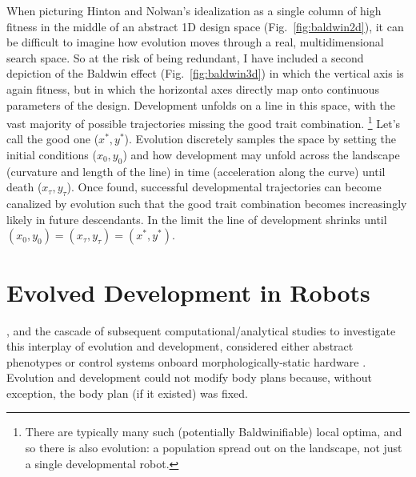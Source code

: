 When picturing Hinton and Nolwan's idealization as a single column of high fitness in the middle of an abstract 1D design space (Fig.~\ref{fig:baldwin2d}), it can be difficult to imagine how evolution moves through a real, multidimensional search space. 
So at the risk of being redundant, 
I have included a second depiction of the Baldwin effect (Fig.~\ref{fig:baldwin3d}) in which the vertical axis is again fitness, but in which the horizontal axes directly map onto continuous parameters of the design.
Development unfolds on a line in this space, with the vast majority of possible trajectories missing the good trait combination.%
\footnote{%
There are typically many such (potentially Baldwinifiable) local optima, and so there is also evolution: a population spread out on the landscape, not just a single developmental robot.%
} 
Let's call the good one ($x^*,y^*$).
Evolution discretely samples the space by setting the initial conditions ($x_0,y_0$) and how development may unfold across the landscape (curvature and length of the line) in time (acceleration along the curve) until death ($x_{\tau},y_{\tau}$).
Once found, successful developmental trajectories can become canalized by evolution such that the good trait combination becomes increasingly likely in future descendants.
In the limit the line of development shrinks until $(x_0,y_0) = (x_{\tau},y_{\tau}) = (x^*,y^*)$.




\section{Evolved Development in Robots}


\citet{hinton1987learning}, and the cascade of subsequent computational/analytical studies to investigate this interplay of evolution and development,
considered either abstract phenotypes \cite{belew1989evolution,ackley1991interactions,nolfi1994learning,french1994genes,mayley1996landscapes,ancel1999quantitative,ancel2000undermining,sendhoff1999model,suzuki2004interactions,downing2004development,santos2015phenotypic,fernando2018meta,todd2020interaction}
or control systems onboard morphologically-static hardware \cite{floreano1996plastic,husbands1998better}.
Evolution and development could not modify body plans because, without exception, the body plan (if it existed) was fixed.

